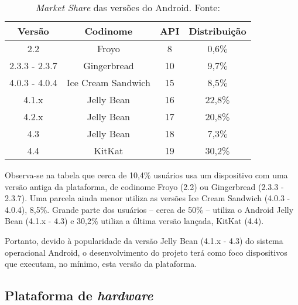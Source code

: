 \begin{table}[h!]

\caption[\textit{Market Share} das versões do Android]{\textit{Market Share} das versões do Android. Fonte: \cite{androidDevDashboards}}
\begin{center}
\begin{tabular}{|c|c|c|c|}
\hline
\textbf{Versão}     &\textbf{Codinome}      & \textbf{API}      &\textbf{Distribuição} \\ \hline \hline
2.2                 & Froyo                 & 8                 & 0,6$\%$	\\
2.3.3 - 2.3.7       & Gingerbread           & 10                & 9,7$\%$	\\
4.0.3 - 4.0.4       & Ice Cream Sandwich    & 15                & 8,5$\%$	\\
4.1.x               & Jelly Bean            & 16                & 22,8$\%$	\\
4.2.x               & Jelly Bean            & 17                & 20,8$\%$	\\
4.3                 & Jelly Bean            & 18                & 7,3$\%$	\\
4.4                 & KitKat                & 19                & 30,2$\%$	\\ \hline
\end{tabular}%
\end{center}
\label{tab:marketShare}
\end{table}

Observa-se na tabela que cerca de 10,4$\%$ usuários usa um dispositivo com uma versão antiga da plataforma, de codinome Froyo (2.2) ou Gingerbread (2.3.3 - 2.3.7). Uma parcela ainda menor utiliza as versões Ice Cream Sandwich (4.0.3 - 4.0.4), 8,5$\%$. Grande parte dos usuários -- cerca de 50$\%$ -- utiliza o Android Jelly Bean (4.1.x - 4.3) e 30,2$\%$ utiliza a última versão lançada, KitKat (4.4).

Portanto, devido à popularidade da versão Jelly Bean (4.1.x - 4.3) do sistema operacional Android, o desenvolvimento do projeto terá como foco dispositivos que executam, no mínimo, esta versão da plataforma.

\subsection{Plataforma de \textit{hardware}}

